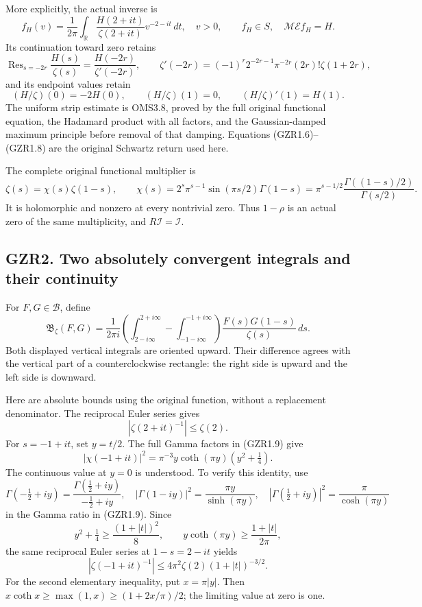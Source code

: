 More explicitly, the actual inverse is \[
f_H(v)=\frac1{2\pi}\int_{\mathbb R}
\frac{H(2+it)}{\zeta(2+it)}v^{-2-it}\,dt,
\quad v>0,
\qquad f_H\in S,\quad \mathcal M\mathcal Ef_H=H .
\tag{GZR1.6}
\] Its continuation toward zero retains \[
\operatorname{Res}_{s=-2r}\frac{H(s)}{\zeta(s)}
 =\frac{H(-2r)}{\zeta'(-2r)},\qquad
\zeta'(-2r)=(-1)^r2^{-2r-1}\pi^{-2r}(2r)!\zeta(1+2r),
\tag{GZR1.7}
\] and its endpoint values retain \[
(H/\zeta)(0)=-2H(0),\qquad
(H/\zeta)(1)=0,\qquad
(H/\zeta)'(1)=H(1).
\tag{GZR1.8}
\] The uniform strip estimate is OMS3.8, proved by the full original
functional equation, the Hadamard product with all factors, and the
Gaussian-damped maximum principle before removal of that damping.
Equations (GZR1.6)--(GZR1.8) are the original Schwartz return used here.

The complete original functional multiplier is \[
\zeta(s)=\chi(s)\zeta(1-s),\qquad
\chi(s)=2^s\pi^{s-1}\sin(\pi s/2)\Gamma(1-s)
=\pi^{s-1/2}\frac{\Gamma((1-s)/2)}{\Gamma(s/2)}.
\tag{GZR1.9}
\] It is holomorphic and nonzero at every nontrivial zero. Thus
\(1-\rho\) is an actual zero of the same multiplicity, and
\(R\mathcal I=\mathcal I\).

\subsection{GZR2. Two absolutely convergent integrals and their
continuity}\label{gzr2.-two-absolutely-convergent-integrals-and-their-continuity}

For \(F,G\in\mathcal B\), define \[
\mathfrak B_\zeta(F,G)=\frac1{2\pi i}
\left(
\int_{2-i\infty}^{2+i\infty}
-\int_{-1-i\infty}^{-1+i\infty}
\right)\frac{F(s)G(1-s)}{\zeta(s)}\,ds .
\tag{GZR2.1}
\] Both displayed vertical integrals are oriented upward. Their
difference agrees with the vertical part of a counterclockwise
rectangle: the right side is upward and the left side is downward.

Here are absolute bounds using the original function, without a
replacement denominator. The reciprocal Euler series gives \[
|\zeta(2+it)^{-1}|\le\zeta(2).
\tag{GZR2.2}
\] For \(s=-1+it\), set \(y=t/2\). The full Gamma factors in (GZR1.9)
give \[
|\chi(-1+it)|^2
=\pi^{-3}y\coth(\pi y)(y^2+\tfrac14).
\tag{GZR2.3}
\] The continuous value at \(y=0\) is understood. To verify this
identity, use \[
\Gamma(-\tfrac12+iy)
=\frac{\Gamma(\tfrac12+iy)}{-\tfrac12+iy},
\quad
|\Gamma(1-iy)|^2=\frac{\pi y}{\sinh(\pi y)},
\quad
|\Gamma(\tfrac12+iy)|^2=\frac{\pi}{\cosh(\pi y)}
\] in the Gamma ratio in (GZR1.9). Since \[
y^2+\tfrac14\ge\frac{(1+|t|)^2}{8},
\qquad
y\coth(\pi y)\ge\frac{1+|t|}{2\pi},
\] the same reciprocal Euler series at \(1-s=2-it\) yields \[
|\zeta(-1+it)^{-1}|
\le4\pi^2\zeta(2)(1+|t|)^{-3/2}.
\tag{GZR2.4}
\] For the second elementary inequality, put \(x=\pi|y|\). Then
\(x\coth x\ge\max(1,x)\ge(1+2x/\pi)/2\); the limiting value at zero is
one.

